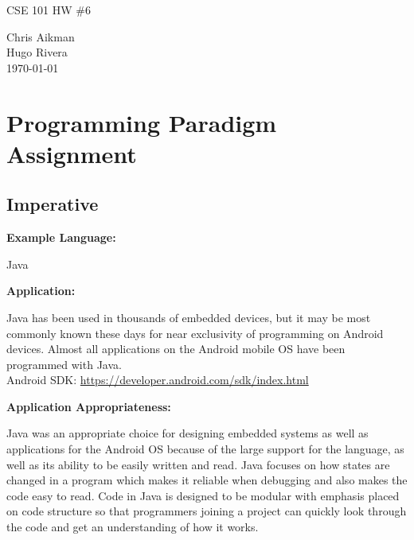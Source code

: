\documentclass[12pt]{article}
\begin{document}
\begin{titlepage}
\begin{center}
\Huge {CSE 101 HW \#6}\\
[1cm]
\normalsize

Chris Aikman\\
Hugo Rivera\\
[1cm]

{\today}

\end{center}
\end{titlepage}

\newpage

\section{Programming Paradigm Assignment}
\subsection{Imperative}
\begin{addmargin}[1cm]{0em}
\textbf{Example Language:}
	\begin{addmargin}[1cm]{0em}
		Java
	\end{addmargin}
\end{addmargin}

\begin{addmargin}[1cm]{0em}%
\textbf{Application:}
	\begin{addmargin}[1cm]{0em}
		Java has been used in thousands of embedded devices, but it may be most commonly known these days for near exclusivity of programming on Android devices. Almost all applications on the Android mobile OS have been programmed with Java.\\
		Android SDK: \url{https://developer.android.com/sdk/index.html}
	\end{addmargin}
\end{addmargin}

\begin{addmargin}[1cm]{0em}
\textbf{Application Appropriateness:}
	\begin{addmargin}[1cm]{0em}
		Java was an appropriate choice for designing embedded systems as well as applications for the Android OS because of the large support for the language, as well as its ability to be easily written and read. Java focuses on how states are changed in a program which makes it reliable when debugging and also makes the code easy to read. Code in Java is designed to be modular with emphasis placed on code structure so that programmers joining a project can quickly look through the code and get an understanding of how it works.
	\end{addmargin}
\end{addmargin}
\end{document}
